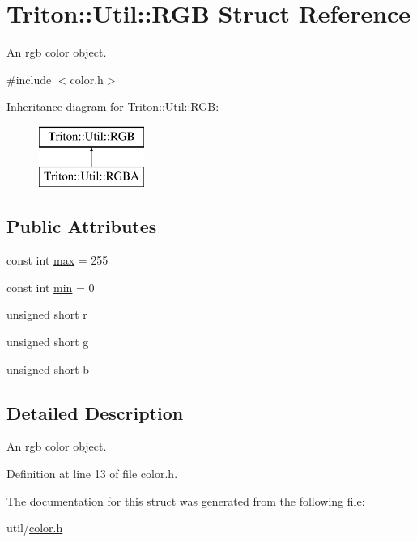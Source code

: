 \hypertarget{struct_triton_1_1_util_1_1_r_g_b}{}\section{Triton\+:\+:Util\+:\+:R\+G\+B Struct Reference}
\label{struct_triton_1_1_util_1_1_r_g_b}


An rgb color object.  




{\ttfamily \#include $<$color.\+h$>$}

Inheritance diagram for Triton\+:\+:Util\+:\+:R\+G\+B\+:\begin{figure}[H]
\begin{center}
\leavevmode
\includegraphics[height=2.000000cm]{struct_triton_1_1_util_1_1_r_g_b}
\end{center}
\end{figure}
\subsection*{Public Attributes}
\begin{DoxyCompactItemize}
\item 
const int \hyperlink{group__lus__color_ga25c01b9de0c18136b41333c426c2b226}{max} = 255
\item 
const int \hyperlink{group__lus__color_gaf4323053c0ecc091d206864ca2bbd26e}{min} = 0
\item 
unsigned short \hyperlink{group__lus__color_ga1fcfba2ad564a76d12f72f4b7441b3dc}{r}
\item 
unsigned short \hyperlink{group__lus__color_ga595248e981b342dfdeb08dc85f190229}{g}
\item 
unsigned short \hyperlink{group__lus__color_gadac238b0db4b4534cfa592331234b403}{b}
\end{DoxyCompactItemize}


\subsection{Detailed Description}
An rgb color object. 

Definition at line 13 of file color.\+h.



The documentation for this struct was generated from the following file\+:\begin{DoxyCompactItemize}
\item 
util/\hyperlink{color_8h}{color.\+h}\end{DoxyCompactItemize}
